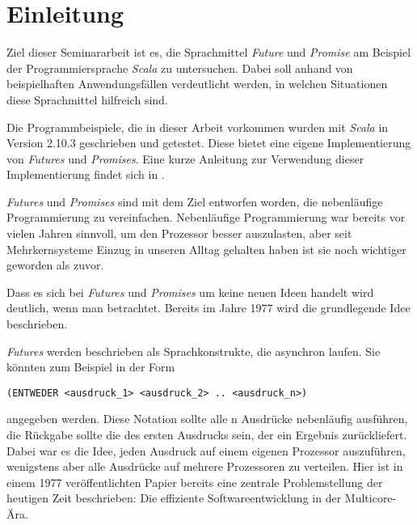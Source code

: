 \section{Einleitung}

Ziel dieser Seminararbeit ist es, die Sprachmittel \emph{Future}
und \emph{Promise} am Beispiel der Programmiersprache \emph{Scala}
zu untersuchen. Dabei soll anhand von beispielhaften Anwendungsfällen
verdeutlicht werden, in welchen Situationen diese Sprachmittel
hilfreich sind.

Die Programmbeispiele, die in dieser Arbeit vorkommen wurden mit
\emph{Scala} in Version 2.10.3 geschrieben und getestet. Diese bietet
eine eigene Implementierung von \emph{Futures} und \emph{Promises}.
Eine kurze Anleitung zur Verwendung dieser Implementierung findet sich in
\cite{sip14}.

\emph{Futures} und \emph{Promises} sind mit dem Ziel entworfen worden,
die nebenläufige Programmierung zu vereinfachen. Nebenläufige Programmierung
war bereits vor vielen Jahren sinnvoll, um den Prozessor besser auszulasten,
aber seit Mehrkernsysteme Einzug in unseren Alltag gehalten haben
ist sie noch wichtiger geworden als zuvor.

Dass es sich bei \emph{Futures} und \emph{Promises} um keine neuen
Ideen handelt wird deutlich, wenn man \cite{Baker:1977:IGC:872734.806932}
betrachtet. Bereits im Jahre 1977 wird die grundlegende Idee beschrieben.

\emph{Futures} werden beschrieben als Sprachkonstrukte, die asynchron laufen. Sie 
könnten zum Beispiel in der Form 
\begin{lstlisting}
(ENTWEDER <ausdruck_1> <ausdruck_2> .. <ausdruck_n>)
\end{lstlisting}
angegeben werden. Diese Notation sollte alle n Ausdrücke nebenläufig ausführen, 
die Rückgabe sollte die des ersten Ausdrucks sein, der ein Ergebnis zurückliefert.
Dabei war es die Idee, jeden Ausdruck auf einem eigenen Prozessor auszuführen, 
wenigstens aber alle Ausdrücke auf mehrere Prozessoren zu verteilen. Hier ist in 
einem 1977 veröffentlichten Papier bereits eine zentrale Problemstellung der 
heutigen Zeit beschrieben: Die effiziente Softwareentwicklung in der Multicore-Ära.
